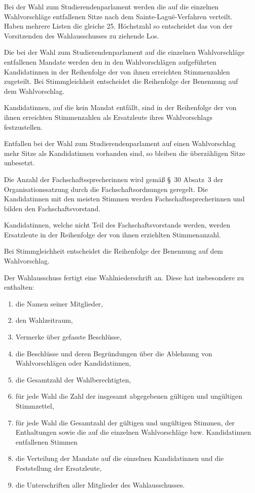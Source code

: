 \begin{jurdoc}
\label{wahl:sitzverteilungstupa}
Bei der Wahl zum Studierendenparlament werden die auf die einzelnen Wahlvorschläge entfallenen Sitze nach dem Sainte-Laguë-Verfahren verteilt. Haben mehrere Listen die gleiche 25. Höchstzahl so entscheidet das von der Vorsitzenden des Wahlausschusses zu ziehende Los.

Die bei der Wahl zum Studierendenparlament auf die einzelnen Wahlvorschläge entfallenen Mandate werden den in den Wahlvorschlägen aufgeführten Kandidatinnen in der Reihenfolge der von ihnen erreichten Stimmenzahlen zugeteilt. Bei Stimmgleichheit entscheidet die Reihenfolge der Benennung auf dem Wahlvorschlag.

Kandidatinnen, auf die kein Mandat entfällt, sind in der Reihenfolge der von ihnen erreichten Stimmenzahlen als Ersatzleute ihres Wahlvorschlags festzustellen.

Entfallen bei der Wahl zum Studierendenparlament auf einen Wahlvorschlag mehr Sitze als Kandidatinnen vorhanden sind, so bleiben die überzähligen Sitze unbesetzt.

\label{wahl:fsvorstaende}
Die Anzahl der Fachschaftssprecherinnen wird gemäß §~30 Absatz~3 der Organisationssatzung durch die Fachschaftsordnungen geregelt. Die Kandidatinnen mit den meisten Stimmen werden Fachschaftssprecherinnen und bilden den Fachschaftsvorstand.

Kandidatinnen, welche nicht Teil des Fachschaftsvorstands werden, werden Ersatzleute in der Reihenfolge der von ihnen erziehlten Stimmenanzahl.

Bei Stimmgleichheit entscheidet die Reihenfolge der Benennung auf dem Wahlvorschlag.

\label{wahl:wahlniederschrift}
Der Wahlausschuss fertigt eine Wahlniederschrift an. Diese hat insbesondere zu enthalten:
\begin{enumerate}
    \item die Namen seiner Mitglieder,
    \item den Wahlzeitraum,
    \item Vermerke über gefasste Beschlüsse,
    \item die Beschlüsse und deren Begründungen über die Ablehnung von Wahlvorschlägen oder Kandidatinnen,
    \item die Gesamtzahl der Wahlberechtigten,
    \item für jede Wahl die Zahl der insgesamt abgegebenen gültigen und ungültigen Stimmzettel,
    \item für jede Wahl die Gesamtzahl der gültigen und ungültigen Stimmen, der Enthaltungen sowie die auf die einzelnen Wahlvorschläge bzw. Kandidatinnen entfallenen Stimmen
    \item die Verteilung der Mandate auf die einzelnen Kandidatinnen und die Feststellung der Ersatzleute,
    \item die Unterschriften aller Mitglieder des Wahlausschusses.
\end{enumerate}


\end{jurdoc}
